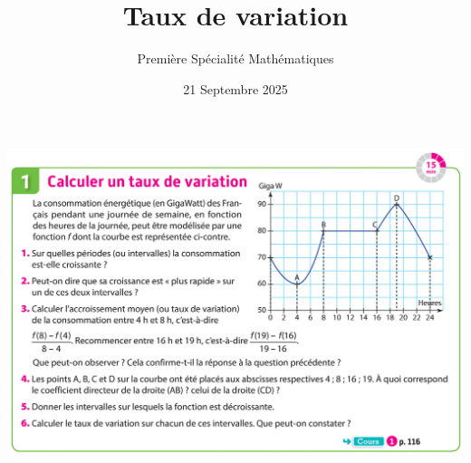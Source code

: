 \documentclass{article}
\title{Taux de variation}
\date{21 Septembre 2025}
\author{Première Spécialité Mathématiques}
\begin{document}
\maketitle
\includegraphics[width=\textwidth]{Taux_Variation_activite.png}
\end{document}
